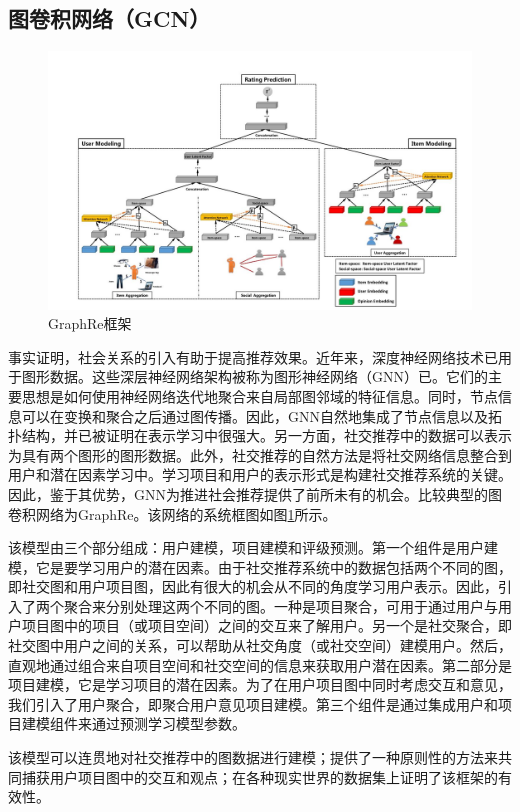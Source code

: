 \subsection{图卷积网络（GCN）}
\begin{figure}
    \includegraphics[width=0.9\linewidth]{dpfig/fig3.JPG}
    \caption{GraphRe框架}
    \label{fig3}
\end{figure}
事实证明，社会关系的引入有助于提高推荐效果。近年来，深度神经网络技术已用于图形数据。这些深层神经网络架构被称为图形神经网络（GNN）已。它们的主要思想是如何使用神经网络迭代地聚合来自局部图邻域的特征信息。同时，节点信息可以在变换和聚合之后通过图传播。因此，GNN自然地集成了节点信息以及拓扑结构，并已被证明在表示学习中很强大。另一方面，社交推荐中的数据可以表示为具有两个图形的图形数据。此外，社交推荐的自然方法是将社交网络信息整合到用户和潜在因素学习中。学习项目和用户的表示形式是构建社交推荐系统的关键。因此，鉴于其优势，GNN为推进社会推荐提供了前所未有的机会。比较典型的图卷积网络为GraphRe\cite{fan2019graph}。该网络的系统框图如图\ref{fig3}所示。


该模型由三个部分组成：用户建模，项目建模和评级预测。第一个组件是用户建模，它是要学习用户的潜在因素。由于社交推荐系统中的数据包括两个不同的图，即社交图和用户项目图，因此有很大的机会从不同的角度学习用户表示。因此，引入了两个聚合来分别处理这两个不同的图。一种是项目聚合，可用于通过用户与用户项目图中的项目（或项目空间）之间的交互来了解用户。另一个是社交聚合，即社交图中用户之间的关系，可以帮助从社交角度（或社交空间）建模用户。然后，直观地通过组合来自项目空间和社交空间的信息来获取用户潜在因素。第二部分是项目建模，它是学习项目的潜在因素。为了在用户项目图中同时考虑交互和意见，我们引入了用户聚合，即聚合用户意见项目建模。第三个组件是通过集成用户和项目建模组件来通过预测学习模型参数。

该模型可以连贯地对社交推荐中的图数据进行建模；提供了一种原则性的方法来共同捕获用户项目图中的交互和观点；在各种现实世界的数据集上证明了该框架的有效性。 

